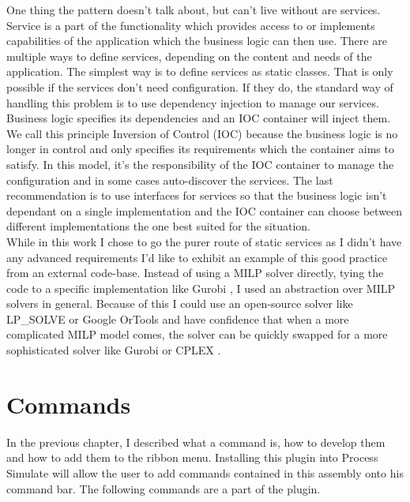 One thing the pattern doesn't talk about, but can't live without are services. 
Service is a part of the functionality which provides access to or implements capabilities of the application which the business logic can then use.
There are multiple ways to define services, depending on the content and needs of the application.
The simplest way is to define services as static classes. 
That is only possible if the services don't need configuration.
If they do, the standard way of handling this problem is to use dependency injection to manage our services.
Business logic specifies its dependencies and an IOC container will inject them.
We call this principle Inversion of Control (IOC) because the business logic is no longer in control and only specifies its requirements which the container aims to satisfy.
In this model, it's the responsibility of the IOC container to manage the configuration and in some cases auto-discover the services.
The last recommendation is to use interfaces for services so that the business logic isn't dependant on a single implementation and the IOC container can choose between different implementations the one best suited for the situation. \\

While in this work I chose to go the purer route of static services as I didn't have any advanced requirements I'd like to exhibit an example of this good practice from an external code-base. 
Instead of using a MILP solver directly, tying the code to a specific implementation like Gurobi \cite{Gurobi}, I used an abstraction over MILP solvers in general. 
Because of this I could use an open-source solver like LP\_SOLVE \cite{LPSolve} or Google OrTools \cite{GoogleOrTools} and have confidence that when a more complicated MILP model comes, the solver can be quickly swapped for a more sophisticated solver like Gurobi \cite{Gurobi} or CPLEX \cite{CPLEX}.

\section{Commands}

In the previous chapter, I described what a command is, how to develop them and how to add them to the ribbon menu. 
Installing this plugin into Process Simulate will allow the user to add commands contained in this assembly onto his command bar. The following commands are a part of the plugin.

